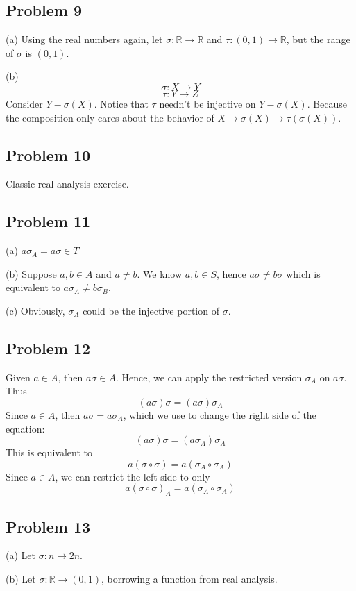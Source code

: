 \documentclass{book}
\begin{document}
\subsection*{Problem 9}
(a)
Using the real numbers again, let $\sigma: \mathbb{R} \rightarrow \mathbb{R}$ and $\tau: (0, 1) \rightarrow \mathbb{R}$, but the range of $\sigma$ is $(0, 1)$.

\noindent
(b)
$$\sigma: X \rightarrow Y$$
$$\tau: Y \rightarrow Z$$
Consider $Y - \sigma(X)$. Notice that $\tau$ needn't be injective on $Y - \sigma(X)$. Because the composition only cares about the behavior of $X \rightarrow \sigma(X) \rightarrow \tau(\sigma(X))$.

\subsection*{Problem 10}
Classic real analysis exercise.

\subsection*{Problem 11}
(a)
$a \sigma_A = a \sigma \in T$

\noindent
(b)
Suppose $a, b \in A$ and $a \neq b$. We know $a, b \in S$, hence $a \sigma \neq b \sigma$ which is equivalent to $a \sigma_A \neq b \sigma_B$.

\noindent
(c)
Obviously, $\sigma_A$ could be the injective portion of $\sigma$.

\subsection*{Problem 12}
Given $a \in A$, then $a \sigma \in A$. Hence, we can apply the restricted version $\sigma_A$ on $a \sigma$. Thus
$$(a \sigma) \sigma = (a \sigma) \sigma_A$$
Since $a \in A$, then $a \sigma = a \sigma_A$, which we use to change the right side of the equation:
$$(a \sigma) \sigma = (a \sigma_A) \sigma_A$$
This is equivalent to
$$a (\sigma \circ \sigma) = a (\sigma_A \circ \sigma_A)$$
Since $a \in A$, we can restrict the left side to only
$$a(\sigma \circ \sigma)_A = a(\sigma_A \circ \sigma_A)$$

\subsection*{Problem 13}
(a)
Let $\sigma: n \mapsto 2n$.

\noindent
(b)
Let $\sigma: \mathbb{R} \rightarrow (0, 1)$, borrowing a function from real analysis.
\end{document}
